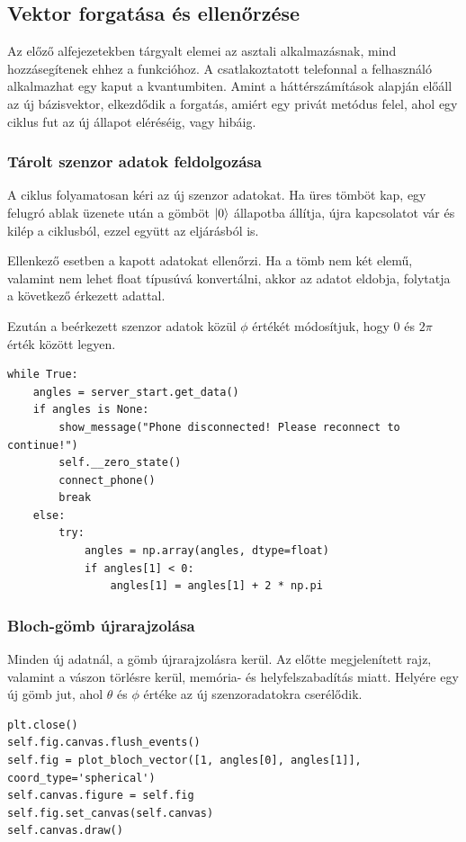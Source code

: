 \documentclass[
]{thesis-ekf}
\theoremstyle{definition}
\theoremstyle{remark}
\begin{document}
\subsection{Vektor forgatása és ellenőrzése}
Az előző alfejezetekben tárgyalt elemei az asztali alkalmazásnak, mind hozzásegítenek ehhez a funkcióhoz. A csatlakoztatott telefonnal a felhasználó alkalmazhat egy kaput a kvantumbiten. Amint a háttérszámítások alapján előáll az új bázisvektor, elkezdődik a forgatás, amiért egy privát metódus felel, ahol egy ciklus fut az új állapot eléréséig, vagy hibáig.

\subsubsection{Tárolt szenzor adatok feldolgozása}
A ciklus folyamatosan kéri az új szenzor adatokat. Ha üres tömböt kap, egy felugró ablak üzenete után a gömböt $\ket{0}$ állapotba állítja, újra kapcsolatot vár és kilép a ciklusból, ezzel együtt az eljárásból is.

Ellenkező esetben a kapott adatokat ellenőrzi. Ha a tömb nem két elemű, valamint nem lehet float típusúvá konvertálni, akkor az adatot eldobja, folytatja a következő érkezett adattal.

Ezután a beérkezett szenzor adatok közül $\phi$ értékét módosítjuk, hogy 0 és $2\pi$ érték között legyen.

\begin{lstlisting}[caption={Tárolt szenzor adatok feldolgozása}]
while True:
	angles = server_start.get_data()
	if angles is None:
		show_message("Phone disconnected! Please reconnect to continue!")
		self.__zero_state()
		connect_phone()
		break
	else:
		try:
			angles = np.array(angles, dtype=float)
			if angles[1] < 0:
				angles[1] = angles[1] + 2 * np.pi
\end{lstlisting}

\subsubsection{Bloch-gömb újrarajzolása}
Minden új adatnál, a gömb újrarajzolásra kerül. Az előtte megjelenített rajz, valamint a vászon törlésre kerül, memória- és helyfelszabadítás miatt. Helyére egy új gömb jut, ahol $\theta$ és $\phi$ értéke az új szenzoradatokra cserélődik.

\begin{lstlisting}[caption={Bloch-gömb újrarajzolása}]
plt.close()
self.fig.canvas.flush_events()
self.fig = plot_bloch_vector([1, angles[0], angles[1]], coord_type='spherical')
self.canvas.figure = self.fig
self.fig.set_canvas(self.canvas)
self.canvas.draw()
\end{lstlisting}
\end{document}
